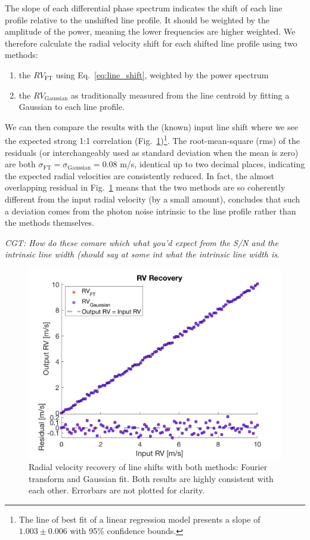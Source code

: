 The slope of each differential phase spectrum indicates the shift of each line profile relative to 
the unshifted line profile. It should be weighted by the amplitude of the power, meaning the lower frequencies 
are higher weighted. We therefore calculate the radial velocity shift for each shifted line profile
using two methods: 
\begin{enumerate}
	\item the $RV_\text{FT}$ using Eq.~\ref{eq:line_shift}, weighted by the power spectrum
	\item the $RV_\text{Gaussian}$ as traditionally measured from the line centroid by fitting a Gaussian to each line profile.
\end{enumerate}
We can then compare the results with the (known) input line shift where we see the expected strong 1:1 correlation (Fig.~\ref{fig:rv_recovery})\footnote{The line of best fit of a linear regression model presents a slope of $1.003\pm0.006$ with 95\% confidence bounds. 
}. The root-mean-square (rms) of the residuals (or interchangeably used as standard deviation when the mean is zero) are both $\sigma_\text{FT} = \sigma_\text{Gaussian} = 0.08$ m/s, identical up to two decimal places, indicating the expected radial velocities are consistently reduced. In fact, the almost overlapping residual in Fig.~\ref{fig:rv_recovery} means that the two methods are so coherently different from the input radial velocity (by a small amount), concludes that such a deviation comes from the photon noise intrinsic to the line profile rather than the methods themselves. 

{\em CGT: How do these comare which what you'd expect from the S/N and the intrinsic line width (should say at some int what the intrinsic line width is}.

\begin{figure}[tbp]
\centering
\includegraphics[width = 0.7 \linewidth]
{./Figures/Methods/5-LINE_SHIFT_ONLY.png}
\caption[Radial velocity recovery]
{Radial velocity recovery of line shifts with both methods: Fourier transform and Gaussian fit. Both results are highly consistent with each other. Errorbars are not plotted for clarity.}
\label{fig:rv_recovery}
\end{figure} 
\FloatBarrier

